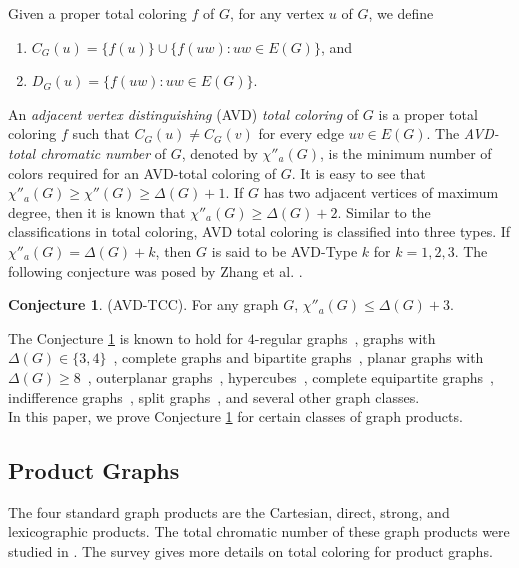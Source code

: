 \documentclass[12pt]{article}
\theoremstyle{definition}
\newtheorem{conjecture}[defn]{Conjecture}
\begin{document}
Given a proper total coloring $f$ of $G$, for any vertex $u$ of $G$, we define 
\begin{enumerate}
    \item $C_G(u)=\{f(u)\}\cup\{f(uw):uw\in E(G)\}$, and 
    \item $D_G(u)=\{f(uw):uw\in E(G)\}$. 
\end{enumerate}
An {\em adjacent vertex distinguishing} (AVD)  {\em total coloring} of $G$ is a proper total coloring $f$ such that $C_G(u)\neq C_G(v)$ for every edge $uv\in E(G)$. The {\em AVD-total chromatic number} of $G$, denoted by $\chi''_{a}(G)$, is the minimum number of colors required for an AVD-total coloring of $G$. It is easy to see that $\chi''_{a}(G) \geq \chi''(G)\geq \Delta(G)+1.$ If  
$G$ has two adjacent vertices of maximum degree, then it is known that $\chi''_{a}(G) \geq \Delta(G)+2.$ Similar to the classifications in total coloring, AVD total coloring is classified into three types. If $\chi''_{a}(G) = \Delta(G)+k$, then $G$ is  said to be AVD-Type $k$ for $k=1,2,3$. The following conjecture was posed by Zhang et al. \cite{ZCYLW2005}.

\begin{conjecture}\label{Conjecture 1.2}(AVD-TCC). For any graph $G$, $\chi''_{a}(G) \leq \Delta(G) +3$.
\end{conjecture}

The Conjecture \ref{Conjecture 1.2} is known to hold for $4$-regular graphs~\cite{PR2014}, graphs with $\Delta(G)\in\{3,4\}$~\cite{Wang2007,Che2008,LLLM2017}, complete graphs and bipartite graphs~\cite{ZCYLW2005}, planar graphs with $\Delta(G)\ge 8$~\cite{CHWY2020,CWW2017, HWWY2019,HW2012, WH2014,WHHW2019}, outerplanar graphs~\cite{WW2010}, hypercubes~\cite{CG2009}, complete equipartite graphs~\cite{LCM2015}, indifference graphs~\cite{PM2010}, split graphs~\cite{VFP2022}, and several other graph classes.\\
In this paper, we prove Conjecture \ref{Conjecture 1.2} for certain classes of graph products. 


\subsection{Product Graphs}
The four standard graph products are the Cartesian, direct, strong, and lexicographic products.
The total chromatic number of these graph products were studied in \cite{GK2018, KM2003, SAWW1997, SGV2023}. The survey \cite{GNS2023} gives more details on total coloring for product graphs.
\end{document}
